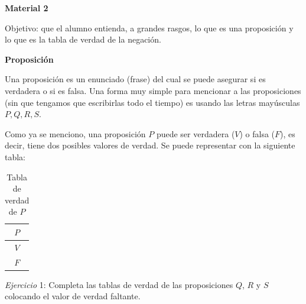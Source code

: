 \documentclass[letterpaper, twoside]{article}
\begin{document}
\newpage

\clearpage
\fancyhf{}
\setcounter{page}{1} %
\cfoot{\thepage}

\begin{center}
  \textbf{\large Material 2}
\end{center}

\vspace{.5cm}

Objetivo: que el alumno entienda, a grandes rasgos, lo que es una proposición y lo que es la tabla de verdad de la negación.

\vspace{.5cm}

\textbf{Proposición}

Una proposición es un enunciado (frase) del cual se puede asegurar si es verdadera o si es falsa. Una forma muy simple para mencionar a las proposiciones (sin que tengamos que escribirlas todo el tiempo) es usando las letras mayúsculas $P,Q,R,S$.\par

\vspace{.5cm}

Como ya se menciono, una proposición $P$ puede ser verdadera ($V$) o falsa ($F$), es decir, tiene dos posibles valores de verdad. Se puede representar con la siguiente tabla:\par

\vspace{.5cm}

\begin{table}[h]
  \centering
    \begin{tabular}{|c|}
      \hline
      $P$ \\ \hline
      $V$ \\ \hline
      $F$ \\
      \hline
    \end{tabular}
  \caption*{Tabla de verdad de $P$}
\end{table}

\vspace{1cm}

\textit{Ejercicio} 1: Completa las tablas de verdad de las proposiciones $Q$, $R$ y $S$ colocando el valor de verdad faltante.

\vspace{.5cm}
\end{document}
